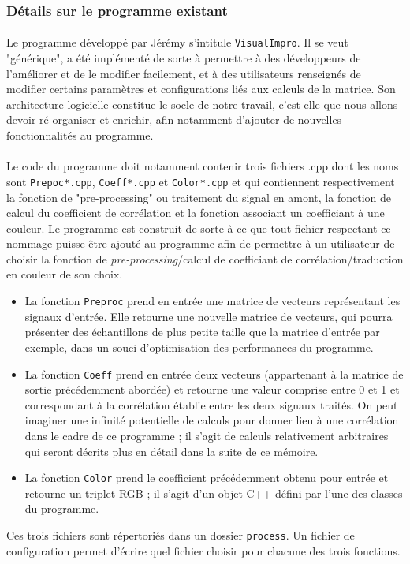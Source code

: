 \subsubsection{Détails sur le programme existant}
\paragraph{}
Le programme développé par Jérémy s'intitule \verb!VisualImpro!. Il se
veut "générique", a été implémenté de sorte à permettre à des
développeurs de l'améliorer et de le modifier facilement, et à des
utilisateurs renseignés de modifier certains paramètres et
configurations liés aux calculs de la matrice. Son architecture
logicielle constitue le socle de notre travail, c'est elle que nous
allons devoir ré-organiser et enrichir, afin notamment d'ajouter de
nouvelles fonctionnalités au programme.
\paragraph{}
Le code du programme doit notamment contenir trois fichiers .cpp dont
les noms sont \verb!Prepoc*.cpp!, \verb!Coeff*.cpp! et
\verb!Color*.cpp! et qui contiennent respectivement la fonction de
"pre-processing" ou traitement du signal en amont, la fonction de
calcul du coefficient de corrélation et la fonction associant un
coefficiant à une couleur. Le programme est construit de sorte à ce
que tout fichier respectant ce nommage puisse être ajouté au programme
afin de permettre à un utilisateur de choisir la fonction de
\textit{pre-processing}/calcul de coefficiant de
corrélation/traduction en couleur de son choix.
\begin{itemize}
 \item La fonction \verb!Preproc! prend en entrée une matrice de
       vecteurs représentant les signaux d'entrée. Elle retourne une
       nouvelle matrice de vecteurs, qui pourra présenter des
       échantillons de plus petite taille que la matrice d'entrée par
       exemple, dans un souci d'optimisation des performances du
       programme.
 \item La fonction \verb!Coeff! prend en entrée deux vecteurs
       (appartenant à la matrice de sortie précédemment abordée) et
       retourne une valeur comprise entre 0 et 1 et correspondant à la
       corrélation établie entre les deux signaux traités. On peut
       imaginer une infinité potentielle de calculs pour donner lieu à
       une corrélation dans le cadre de ce programme ; il s'agit de
       calculs relativement arbitraires qui seront décrits plus en détail
       dans la suite de ce mémoire.
 \item La fonction \verb!Color! prend le coefficient précédemment obtenu
       pour entrée et retourne un triplet RGB ; il s'agit d'un objet C++
       défini par l'une des classes du programme.
\end{itemize}
Ces trois fichiers sont répertoriés dans un dossier \verb!process!. Un
fichier de configuration permet d'écrire quel fichier choisir pour
chacune des trois fonctions.

